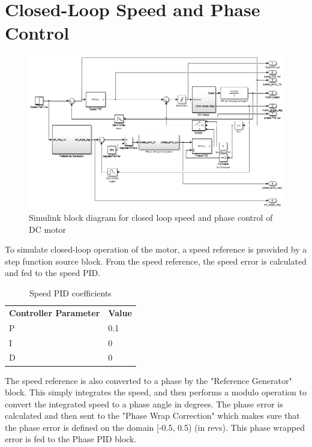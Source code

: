 \documentclass[11pt]{article} %
\begin{document}
\section{Closed-Loop Speed and Phase Control}

\begin{figure}
\centering
\includegraphics[scale=0.75,angle=90,origin=c]{MotorPIDBlockDiagram.png}
\caption{Simulink block diagram for closed loop speed and phase control of DC motor}
\label{fig:closedLoopControl}
\end{figure}

To simulate closed-loop operation of the motor, a speed reference is provided by a step function source block. From the speed reference, the speed error is calculated and fed to the speed PID. 

\begin{table}[h]
\centering
\begin{tabular}{l | l }
\textbf{Controller Parameter} & \textbf{Value} \\
P & 0.1 \\
I & 0 \\
D & 0 \\
\end{tabular}
\caption{Speed PID coefficients}
\label{tab:SpeedPIDcoeffs}
\end{table}

The speed reference is also converted to a phase by the "Reference Generator" block. This simply integrates the speed, and then performs a modulo operation to convert the integrated speed to a phase angle in degrees. The phase error is calculated and then sent to the "Phase Wrap Correction" which makes sure that the phase error is defined on the domain [-0.5, 0.5) (in revs). This phase wrapped error is fed to the Phase PID block.
\end{document}
